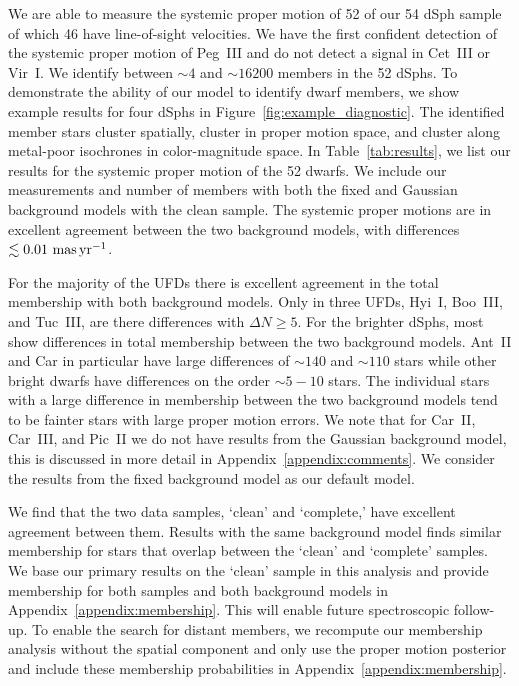 \documentclass[twocolumn]{aastex63}
\begin{document}
We are able to measure the systemic proper motion of 52 of our 54 dSph sample of which 46 have line-of-sight velocities.   
{We have the first confident detection of the systemic proper motion of Peg~III and do not detect a signal in Cet~III or Vir~I.}
We identify between $\sim4$ and $\sim16200$ members in the 52 dSphs.
To demonstrate the ability of our model to identify dwarf members, we show example results for four dSphs in Figure~\ref{fig:example_diagnostic}. The identified member stars cluster spatially, cluster in proper motion space, and cluster along metal-poor isochrones in color-magnitude space. 
In Table~\ref{tab:results}, we list our results for the systemic proper motion of the 52 dwarfs. We include our measurements and number of  members  with both the fixed and Gaussian background models  with the clean sample. 
The systemic proper motions are in excellent agreement between the two background models, with differences $\lesssim 0.01 \mathrm{\,\mathrm{\,mas} \mathrm{\,yr}^{-1}}$. 

For the majority of the UFDs there is excellent agreement in the    total membership with both background models.  Only in three UFDs, Hyi~I, Boo~III, and Tuc~III, are there differences with $\Delta N \geq 5$. 
For the brighter dSphs, most show differences in total membership between the two background models. 
Ant~II and Car in particular have large differences of $\sim 140$ and $\sim 110$ stars while other bright dwarfs have differences on the order $\sim 5-10$ stars. 
The individual stars with a large difference in membership  between the two background models tend to be fainter stars with large proper motion errors.
We note that for Car~II, Car~III, and Pic~II we do not have results from the Gaussian background model, this is discussed in more detail in  Appendix~\ref{appendix:comments}. 
We consider the results from the fixed background model  as our default model.


We  find that the two data samples, `clean' and `complete,' have excellent agreement between them.  
Results with the  same background model finds similar membership for stars that overlap between the `clean' and `complete' samples. 
We base our primary results on the `clean' sample in this analysis and provide  membership for both samples and both background models in Appendix~\ref{appendix:membership}. This will enable future spectroscopic follow-up. 
To enable the search for distant members, we recompute our membership analysis without the spatial component and only use the  proper motion posterior \citep[e.g.,][]{Chiti2020ApJ...891....8C, Qi2022MNRAS.512.5601Q} and include these membership probabilities in Appendix~\ref{appendix:membership}.
\end{document}
